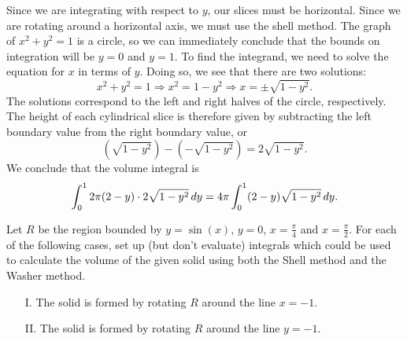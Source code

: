 \documentclass[]{ximera}
\begin{document}
\begin{freeResponse}
Since we are integrating with respect to $y$, our slices must be horizontal. Since we are rotating around a horizontal axis, we must use the shell method. The graph of $x^2+y^2=1$ is a circle, so we can immediately conclude that the bounds on integration will be $y=0$ and $y=1$. To find the integrand, we need to solve the equation for $x$ in terms of $y$. Doing so, we see that there are two solutions:
$$
x^2+y^2 = 1 \Rightarrow x^2 = 1-y^2 \Rightarrow x = \pm \sqrt{1-y^2}.
$$
The solutions correspond to the left and right halves of the circle, respectively. The height of each cylindrical slice is therefore given by subtracting the left boundary value from the right boundary value, or
$$
\left(\sqrt{1-y^2}\right) - \left(-\sqrt{1-y^2}\right) = 2\sqrt{1-y^2}.
$$
We conclude that the volume integral is
$$
\int_0^1 2 \pi (2-y) \cdot 2 \sqrt{1-y^2} \mathop{}\!d y = 4 \pi \int_0^1 (2-y) \sqrt{1-y^2} \mathop{}\!d y.
$$
\end{freeResponse}

\begin{problem}
Let $R$ be the region bounded by $y=\sin (x)$, $y=0$, $x=\frac{\pi}{4}$ and $x = \frac{\pi}{2}$. For each of the following cases, set up (but don't evaluate) integrals which could be used to calculate the volume of the given solid using both the Shell method and the Washer method.

\begin{enumerate}
\item[I.] The solid is formed by rotating $R$ around the line $x = -1$.
\item[II.] The solid is formed by rotating $R$ around the line $y=-1$.
\end{enumerate}
\end{problem}
\end{document}
